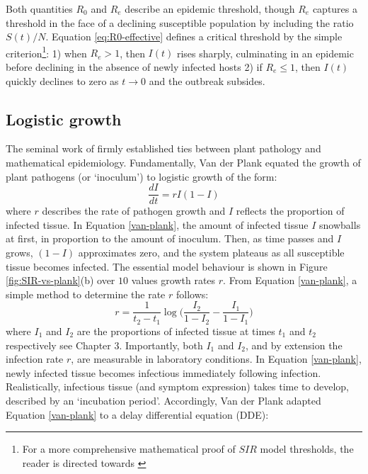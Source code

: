 Both quantities $R_0$ and $R_e$ describe an epidemic threshold, though $R_e$ captures a threshold in the face
of a declining susceptible population by including the ratio $S(t)/N$.
Equation \ref{eq:R0-effective} defines a critical threshold by the simple criterion\footnote{
For a more comprehensive mathematical proof of $SIR$
model thresholds, the reader is directed towards \cite{weiss2013sir}}:
1) when $R_e > 1$, then $I(t)$ rises sharply, culminating in an epidemic before declining in the absence of newly
infected hosts
2) if $R_e \leq 1$, then $I(t)$ quickly declines to zero as $t\rightarrow 0$ and the outbreak subsides.


\subsection{Logistic growth}
\label{sec:logistic-growth}
The seminal work of \cite{van2013plant} firmly established ties between plant pathology and 
mathematical epidemiology.
Fundamentally, Van der Plank equated the growth of plant pathogens (or `inoculum') to logistic growth of the form:
\begin{equation}
    \label{van-plank}
    \frac{dI}{dt} = rI(1 - I)
\end{equation}
where $r$ describes the rate of pathogen growth and $I$ reflects the proportion of infected tissue.
In Equation \ref{van-plank}, the amount of infected tissue $I$ snowballs at first, 
in proportion to the amount of inoculum. Then, as time passes and $I$ grows, $(1-I)$ approximates zero, 
and the system plateaus as all susceptible tissue becomes infected.
The essential model behaviour is shown in Figure \ref{fig:SIR-vs-plank}(b) over $10$ values growth rates $r$.
From Equation \ref{van-plank}, a simple method to determine the rate $r$ follows:
\begin{equation}
    \label{eq:van-plank-r}
    r =\frac{1}{t_2 - t_1} \log \Big(\frac{I_2}{1 - I_2} - \frac{I_1}{1 - I_1}\Big)
\end{equation}
where $I_1$ and $I_2$ are the proportions of infected tissue at times $t_1$ and $t_2$ respectively\textemdash 
see \cite{van2013plant} Chapter 3. Importantly, both $I_1$ and $I_2$, and by extension the infection rate $r$,
are measurable in laboratory conditions. 
In Equation \ref{van-plank}, newly infected tissue becomes infectious immediately following infection.
Realistically, infectious tissue (and symptom expression) takes time to develop, described by an `incubation period'.
Accordingly, Van der Plank adapted Equation \ref{van-plank} to a delay differential equation (DDE):
